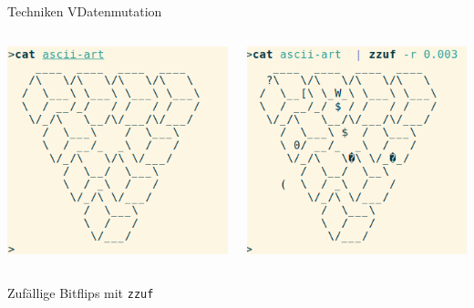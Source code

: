 \documentclass[ngerman,aspectratio=1610,12pt]{beamer}
\begin{document}
\begin{frame}{Techniken V}{Datenmutation\\}
  \begin{center}
    \begin{columns}[T]
      \begin{column}{.5\textwidth}
        \includegraphics[height=0.55\textheight]{images/zzuf1}      
      \end{column}
      \begin{column}{.5\textwidth}
        \includegraphics[height=0.55\textheight]{images/zzuf2}      
      \end{column}   
    \end{columns}
    \vspace{0.5em}
    \hspace{-5em}Zufällige Bitflips mit \texttt{zzuf}
  \end{center}
  
  
\end{frame}
\end{document}
